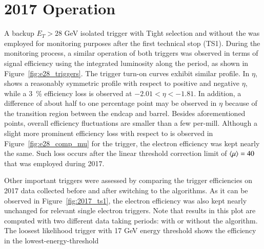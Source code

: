 \section{2017 Operation}\label{ssec:2017_ringer_operation}


A backup $E_T > 28$ GeV isolated trigger with Tight selection and without the \rnn{} was employed for
monitoring purposes after the first technical stop (TS1). During the monitoring process, a similar
operation of both triggers was observed in terms of signal efficiency using the
integrated luminosity along the period, as shown in
Figure~\ref{fig:e28_triggers}. The trigger
turn-on curves exhibit similar profile. In $\eta$, \rnn{} shows a reasonably symmetric
profile with respect to positive and negative $\eta$, while a
\SI{3}{\%} efficiency loss is observed at $-2.01<\eta<-1.81$. In addition, a difference of about half to one percentage point may be observed in $\eta$ because of the transition region between the endcap and barrel. Besides
aforementioned points, overall efficiency fluctuations are smaller than a few
per-mill. Although a slight more prominent efficiency loss with respect to
\avgmu{} is observed in Figure~\ref{fig:e28_comp_mu} for the \rnn{} trigger, the
electron efficiency was kept nearly the same. Such loss occurs after the
linear threshold correction limit of $\langle \mu \rangle=40$ that was employed during 2017.

Other important triggers were assessed by comparing the trigger efficiencies on
2017 data collected before and after switching to the \rnn{} algorithms.  As it can be observed in Figure~\ref{fig:2017_ts1}, the electron efficiency was also kept nearly unchanged for relevant single electron triggers. Note that results in
this plot are computed with two different data taking periods: with or
without the \rnn{} algorithm. The loosest likelihood trigger with 17 GeV energy threshold shows the efficiency in the lowest-energy-threshold 





